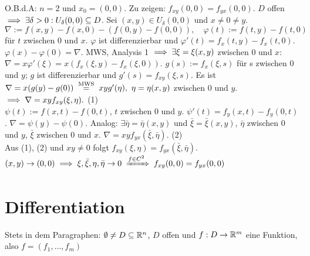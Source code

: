 \documentclass[a4paper,oneside,DIV15,BCOR12mm,chapterprefix=true,headings=onelinechapter]{scrbook}
\begin{document}
\begin{beweis}
O.B.d.A: $n=2$ und $x_0=(0,0)$. Zu zeigen: $f_{xy}(0,0)=f_{yx}(0,0)$. $D$ offen $\implies\exists\delta>0: U_\delta(0,0)\subseteq D$. Sei $(x,y) \in U_\delta(0,0)$ und $x\ne 0\ne y$. $$\nabla:=f(x,y)-f(x,0)-(f(0,y)-f(0,0)),\quad\varphi(t):=f(t,y)-f(t,0)$$ für $t$ zwischen $0$ und $x$. $\varphi$ ist differenzierbar und $\varphi'(t)=f_x(t,y)-f_x(t,0)$. $\varphi(x)-\varphi(0)=\nabla$. MWS, Analysis 1 $\implies\exists\xi=\xi(x,y)$ zwischen $0$ und $x$: $\nabla=x\varphi'(\xi)=x(f_x(\xi,y)-f_x(\xi,0))$. $g(s):=f_x(\xi,s)$ für s zwischen $0$ und $y$; $g$ ist differenzierbar und $g'(s)=f_{xy}(\xi,s)$. Es ist $\nabla=x(g(y)-g(0))\gleichnach{MWS}xyg'(\eta),\ \eta=\eta(x,y)$ zwischen $0$ und $y$. $\implies \nabla=xyf_{xy}(\xi,\eta).$ (1)\\
$\psi(t):=f(x,t)-f(0,t)$, $t$ zwischen $0$ und $y$. $\psi'(t)=f_y(x,t)-f_y(0,t)$. $\nabla=\psi(y)-\psi(0)$. Analog: $\exists \bar\eta=\bar\eta(x,y)$ und $\bar\xi=\bar\xi(x,y)$, $\bar\eta$ zwischen $0$ und $y$, $\bar\xi$ zwischen $0$ und $x$. $\nabla=xyf_{yx}(\bar\xi,\bar\eta).$ (2)\\
Aus (1), (2) und $xy\ne0$ folgt $f_{xy}(\xi,\eta)=f_{yx}(\bar\xi,\bar\eta)$. $(x,y)\to(0,0)\folgt\xi,\bar\xi,\eta,\bar\eta\to 0\folgtwegen{f\in C^2}f_{xy}(0,0)=f_{yx}(0,0)$
\end{beweis}

\chapter{Differentiation}
\def\grad{\mathop{\rm grad}\nolimits}

\begin{vereinbarung}
Stets in dem Paragraphen: $\emptyset\ne D\subseteq\mathbb{R}^n$, $D$ offen und $f:D\to\mathbb{R}^m$ eine Funktion, also $f=(f_1,\ldots,f_m)$
\end{vereinbarung}
\end{document}
